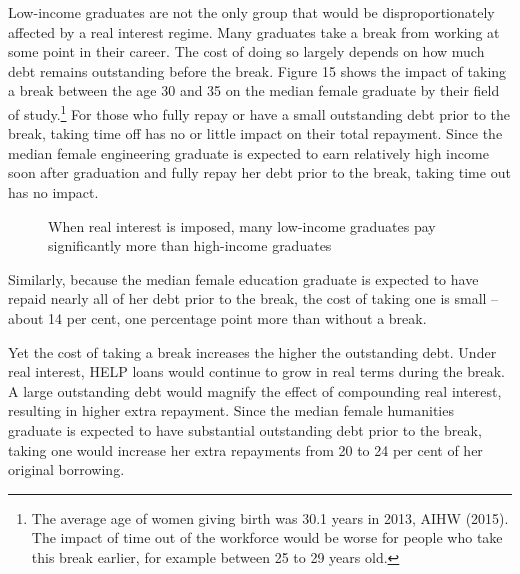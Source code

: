 \documentclass[embargoed]{grattan}
\begin{document}
Low-income graduates are not the only group that would be disproportionately affected by a real interest regime. Many graduates take a break from working at some point in their career. The cost of doing so largely depends on how much debt remains outstanding before the break. Figure 15 shows the impact of taking a break between the age 30 and 35 on the median female graduate by their field of study.\footnote{The average age of women giving birth was 30.1 years in 2013, AIHW (2015). The impact of time out of the workforce would be worse for people who take this break earlier, for example between 25 to 29 years old.} For those who fully repay or have a small outstanding debt prior to the break, taking time off has no or little impact on their total repayment. Since the median female engineering graduate is expected to earn relatively high income soon after graduation and fully repay her debt prior to the break, taking time out has no impact.

\begin{figure}
\caption{When real interest is imposed, many low-income graduates pay significantly more than high-income graduates}\label{fig:fig14-when-real-interest-imposed-many-low-income-grads-pay-signif-more-than-high-income-grads}



%
\end{figure}

Similarly, because the median female education graduate is expected to have repaid nearly all of her debt prior to the break, the cost of taking one is small -- about 14 per cent, one percentage point more than without a break.

Yet the cost of taking a break increases the higher the outstanding debt. Under real interest, HELP loans would continue to grow in real terms during the break. A large outstanding debt would magnify the effect of compounding real interest, resulting in higher extra repayment. Since the median female humanities graduate is expected to have substantial outstanding debt prior to the break, taking one would increase her extra repayments from 20 to 24 per cent of her original borrowing.
\end{document}
